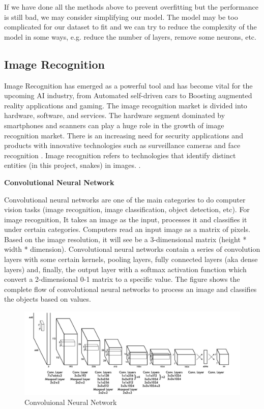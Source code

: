 \documentclass{article}
\begin{document}
If we have done all the methods above to prevent overfitting but the performance is still bad, we may consider simplifying our model. The model may be too complicated for our dataset to fit and we can try to reduce the complexity of the model in some ways, e.g. reduce the number of layers, remove some neurons, etc.


\subsection{Image Recognition}

Image Recognition has emerged as a powerful tool and has become vital for the upcoming AI industry, from Automated self-driven cars to Boosting augmented reality applications and gaming. The image recognition market is divided into hardware, software, and services. The hardware segment dominated by smartphones and scanners can play a huge role in the growth of image recognition market. There is an increasing need for security applications and products with innovative technologies such as surveillance cameras and face recognition \cite{mikolajczyk2005local}. Image recognition refers to technologies that identify distinct entities (in this project, snakes) in images. \cite{boughorbel2005generalized}.

\textbf{Convolutional Neural Network}

Convolutional neural networks are one of the main categories to do computer vision tasks (image recognition, image classification, object detection, etc). For image recognition, It takes an image as the input, processes it and classifies it under certain categories. Computers read an input image as a matrix of pixels. Based on the image resolution, it will see be a 3-dimensional matrix (height * width * dimension). Convolutional neural networks contain a series of convolution layers with some certain kernels, pooling layers, fully connected layers (aka dense layers) and, finally, the output layer with a softmax activation function which convert a 2-dimensional 0-1 matrix to a specific value. The figure shows the complete flow of convolutional neural networks to process an image and classifies the objects based on values.

\begin{figure}[h]
\centering
\includegraphics[scale=0.25]{CNN.jpg}
\caption{Convoluional Neural Network}
\label{fig:CNN}
\end{figure}
\end{document}
